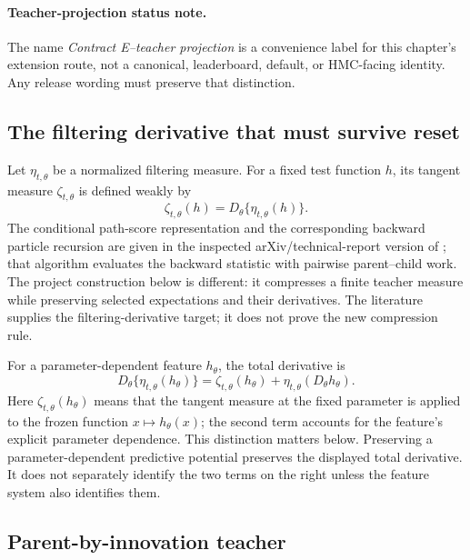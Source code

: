 \paragraph{Teacher-projection status note.}
The name \emph{Contract E--teacher projection} is a convenience label for this
chapter’s extension route, not a canonical, leaderboard, default, or HMC-facing
identity.  Any release wording must preserve that distinction.

\subsection{The filtering derivative that must survive reset}

Let \(\eta_{t,\theta}\) be a normalized filtering measure.  For a fixed test
function \(h\), its tangent measure \(\zeta_{t,\theta}\) is defined weakly by
\begin{equation}
\label{eq:bf-ledh-tangent-measure-definition}
  \zeta_{t,\theta}(h)
  =D_\theta\{\eta_{t,\theta}(h)\}.
\end{equation}
The conditional path-score representation and the corresponding backward
particle recursion are given in the inspected arXiv/technical-report version of
\citet[Section~2, Eq.~(2.5), and Algorithm~1]{delmoral2015uniform}; that
algorithm evaluates the backward statistic with pairwise parent--child work.
The project construction below is different: it compresses a finite teacher
measure while preserving selected expectations and their derivatives.  The
literature supplies the filtering-derivative target; it does not prove the new
compression rule.

For a parameter-dependent feature \(h_\theta\), the total derivative is
\begin{equation}
\label{eq:bf-ledh-parameter-dependent-feature-derivative}
  D_\theta\{\eta_{t,\theta}(h_\theta)\}
  =\zeta_{t,\theta}(h_\theta)
   +\eta_{t,\theta}(D_\theta h_\theta).
\end{equation}
Here \(\zeta_{t,\theta}(h_\theta)\) means that the tangent measure at the fixed
parameter is applied to the frozen function \(x\mapsto h_\theta(x)\); the second
term accounts for the feature's explicit parameter dependence.
This distinction matters below.  Preserving a parameter-dependent predictive
potential preserves the displayed total derivative.  It does not separately
identify the two terms on the right unless the feature system also identifies
them.

\subsection{Parent-by-innovation teacher}

